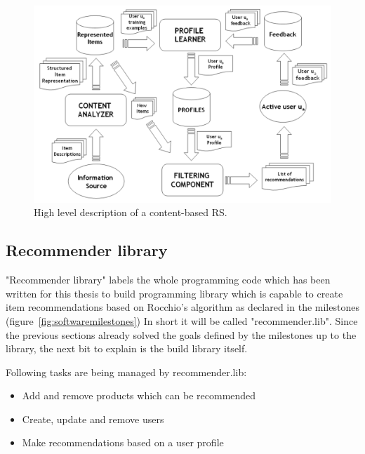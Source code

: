\begin{figure}[h]
    \center
    \includegraphics[scale=0.3]{inc/implementation/HighlevelContentBased}
    \caption{High level description of a content-based RS.\citep[p.~76]{lops:2011}}
    \label{fig:framework-contentbasedrs}
\end{figure}



\FloatBarrier

\FloatBarrier

\FloatBarrier

\subsection{Recommender library}
"Recommender library" labels the whole programming code which has been written for this thesis to build programming library which is capable to create item recommendations based on Rocchio's algorithm as declared in the milestones (figure~\ref{fig:softwaremilestones})
In short it will be called "recommender.lib".
Since the previous sections already solved the goals defined by the milestones up to the library, the next bit to explain is the build library itself.

Following tasks are being managed by recommender.lib:
\begin{itemize}
    \item Add and remove products which can be recommended
    \item Create, update and remove users
    \item Make recommendations based on a user profile
\end{itemize}


